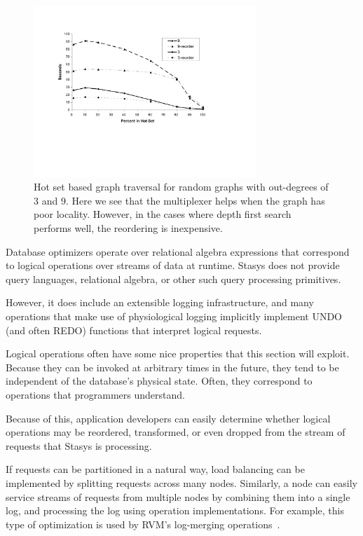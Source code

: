 \documentclass[letterpaper,twocolumn,10pt]{article}
\newcommand{\yad}{Stasys\xspace}
\begin{document}
\begin{figure}[t]
\includegraphics[width=3.3in]{figs/trans-closure-hotset.pdf}
\vspace{-12pt}
\caption{\sf\label{fig:hotGraph} Hot set based graph traversal for random graphs with out-degrees of 3 and 9.  Here
we see that the multiplexer helps when the graph has poor locality.
However, in the cases where depth first search performs well, the
reordering is inexpensive.}
\end{figure}

Database optimizers operate over relational algebra expressions that
correspond to logical operations over streams of data at runtime.  \yad
does not provide query languages, relational algebra, or other such query processing primitives.  

However, it does include an extensible logging infrastructure, and many
operations that make use of physiological logging implicitly
implement UNDO (and often REDO) functions that interpret logical
requests.

Logical operations often have some nice properties that this section
will exploit.  Because they can be invoked at arbitrary times in the
future, they tend to be independent of the database's physical state.
Often, they correspond to operations that programmers understand.

Because of this, application developers can easily determine whether
logical operations may be reordered, transformed, or even
dropped from the stream of requests that \yad is processing.

If requests can be partitioned in a natural way, load
balancing can be implemented by splitting requests across many nodes.
Similarly, a node can easily service streams of requests from multiple
nodes by combining them into a single log, and processing the log
using operation implementations.  For example, this type of optimization 
is used by RVM's log-merging operations~\cite{rvm}.
\end{document}
